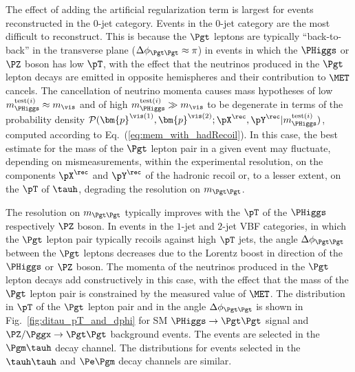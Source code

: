 The effect of adding the artificial regularization term is largest for events reconstructed in the $0$-jet category.
Events in the $0$-jet category are the most difficult to reconstruct.
This is because the $\Pgt$ leptons are typically ``back-to-back'' in the transverse plane ($\Delta\phi_{\Pgt\Pgt} \approx \pi$)
in events in which the $\PHiggs$ or $\PZ$ boson has low $\pT$, 
with the effect that the neutrinos produced in the $\Pgt$ lepton decays are emitted in opposite hemispheres and their contribution to $\MET$ cancels.
The cancellation of neutrino momenta causes mass hypotheses of low $m_{\PHiggs}^{\textrm{test}(i)} \approx m_{\vis}$
and of high $m_{\PHiggs}^{\textrm{test}(i)} \gg m_{\vis}$
to be degenerate in terms of the probability density $\mathcal{P}(\bm{p}^{\vis(1)},\bm{p}^{\vis(2)};\pX^{\rec},\pY^{\rec}|m_{\PHiggs}^{\textrm{test}(i)})$,
computed according to Eq.~(\ref{eq:mem_with_hadRecoil}).
In this case, the best estimate for the mass of the $\Pgt$ lepton pair in a given event may fluctuate, 
depending on mismeasurements, within the experimental resolution, 
on the components $\pX^{\rec}$ and $\pY^{\rec}$ of the hadronic recoil or, to a lesser extent, on the $\pT$ of $\tauh$,
degrading the resolution on $m_{\Pgt\Pgt}$.

The resolution on $m_{\Pgt\Pgt}$ typically improves with the $\pT$ of the $\PHiggs$ respectively $\PZ$ boson.
In events in the $1$-jet and $2$-jet VBF categories,
in which the $\Pgt$ lepton pair typically recoils against high $\pT$ jets,
the angle $\Delta\phi_{\Pgt\Pgt}$ between the $\Pgt$ leptons decreases due to the Lorentz boost in direction of the $\PHiggs$ or $\PZ$ boson.
The momenta of the neutrinos produced in the $\Pgt$ lepton decays add constructively in this case,
with the effect that the mass of the $\Pgt$ lepton pair is constrained by the measured value of $\MET$.
The distribution in $\pT$ of the $\Pgt$ lepton pair and in the angle $\Delta\phi_{\Pgt\Pgt}$ is shown in Fig.~\ref{fig:ditau_pT_and_dphi}
for SM $\PHiggs \to \Pgt\Pgt$ signal and $\PZ/\Pggx \to \Pgt\Pgt$ background events.
The events are selected in the $\Pgm\tauh$ decay channel.
The distributions for events selected in the $\tauh\tauh$ and $\Pe\Pgm$ decay channels are similar.


